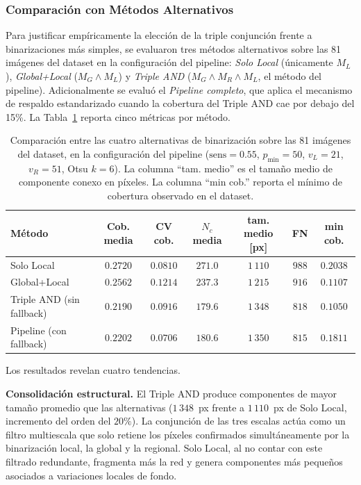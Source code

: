 \subsubsection{Comparación con Métodos Alternativos}
\label{sec:metodos_alternativos}
 
Para justificar empíricamente la elección de la triple conjunción frente a binarizaciones más simples, se evaluaron tres métodos alternativos sobre las 81 imágenes del dataset en la configuración del pipeline: \textit{Solo Local} (únicamente $M_L$), \textit{Global+Local} ($M_G \wedge M_L$) y \textit{Triple AND} ($M_G \wedge M_R \wedge M_L$, el método del pipeline). Adicionalmente se evaluó el \textit{Pipeline completo}, que aplica el mecanismo de respaldo estandarizado cuando la cobertura del Triple AND cae por debajo del 15\%. La Tabla~\ref{tab:comparacion_metodos} reporta cinco métricas por método.
 
\begin{table}[H]
\centering
\caption{Comparación entre las cuatro alternativas de binarización sobre las 81 imágenes del dataset, en la configuración del pipeline ($\text{sens}=0.55$, $p_{\min}=50$, $v_L=21$, $v_R=51$, Otsu $k=6$). La columna ``tam. medio'' es el tamaño medio de componente conexo en píxeles. La columna ``min cob.'' reporta el mínimo de cobertura observado en el dataset.}
\label{tab:comparacion_metodos}
\small
\begin{tabular}{lcccccc}
\toprule
\textbf{Método} & \textbf{Cob. media} & \textbf{CV cob.} & \textbf{$N_c$ media} & \textbf{tam. medio [px]} & \textbf{FN} & \textbf{min cob.} \\
\midrule
Solo Local                  & $0.2720$ & $0.0810$ & $271.0$ & $1\,110$ & $988$ & $0.2038$ \\
Global+Local                & $0.2562$ & $0.1214$ & $237.3$ & $1\,215$ & $916$ & $0.1107$ \\
Triple AND (sin fallback)   & $0.2190$ & $0.0916$ & $179.6$ & $1\,348$ & $818$ & $0.1050$ \\
Pipeline (con fallback)     & $0.2202$ & $0.0706$ & $180.6$ & $1\,350$ & $815$ & $0.1811$ \\
\bottomrule
\end{tabular}
\end{table}
 
Los resultados revelan cuatro tendencias.
 
\textbf{Consolidación estructural.} El Triple AND produce componentes de mayor tamaño promedio que las alternativas ($1\,348$~px frente a $1\,110$~px de Solo Local, incremento del orden del $20\%$). La conjunción de las tres escalas actúa como un filtro multiescala que solo retiene los píxeles confirmados simultáneamente por la binarización local, la global y la regional. Solo Local, al no contar con este filtrado redundante, fragmenta más la red y genera componentes más pequeños asociados a variaciones locales de fondo.
 
